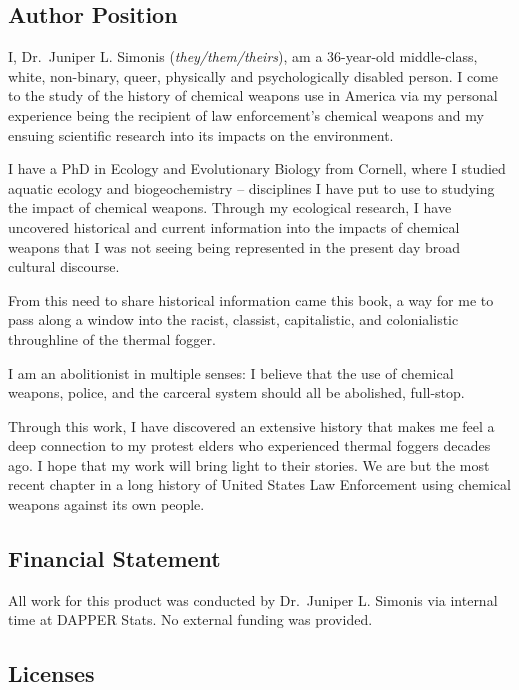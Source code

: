 \documentclass[
  11pt,
]{krantz}
\begin{document}
\hypertarget{author-position}{%
\subsection*{Author Position}\label{author-position}}


I, Dr.~Juniper L. Simonis (\emph{they/them/theirs}), am a 36-year-old middle-class, white, non-binary, queer, physically and psychologically disabled person.
I come to the study of the history of chemical weapons use in America via my personal experience being the recipient of law enforcement's chemical weapons and my ensuing scientific research into its impacts on the environment.

I have a PhD in Ecology and Evolutionary Biology from Cornell, where I studied aquatic ecology and biogeochemistry -- disciplines I have put to use to studying the impact of chemical weapons.
Through my ecological research, I have uncovered historical and current information into the impacts of chemical weapons that I was not seeing being represented in the present day broad cultural discourse.

From this need to share historical information came this book, a way for me to pass along a window into the racist, classist, capitalistic, and colonialistic throughline of the thermal fogger.

I am an abolitionist in multiple senses: I believe that the use of chemical weapons, police, and the carceral system should all be abolished, full-stop.

Through this work, I have discovered an extensive history that makes me feel a deep connection to my protest elders who experienced thermal foggers decades ago.
I hope that my work will bring light to their stories.
We are but the most recent chapter in a long history of United States Law Enforcement using chemical weapons against its own people.

\hypertarget{financial-statement}{%
\subsection*{Financial Statement}\label{financial-statement}}


All work for this product was conducted by Dr.~Juniper L. Simonis via internal time at DAPPER Stats.
No external funding was provided.

\hypertarget{licenses}{%
\subsection*{Licenses}\label{licenses}}
\end{document}
